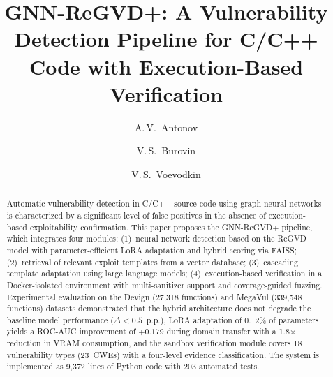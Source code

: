 \documentclass[runningheads]{llncs}
\begin{document}
\title{GNN-ReGVD+: A Vulnerability Detection Pipeline for C/C++ Code with Execution-Based Verification}


\author{A.\,V.~Antonov \and
V.\,S.~Burovin \and
V.\,S.~Voevodkin}



\maketitle

\begin{abstract}
Automatic vulnerability detection in C/C++ source code using graph neural networks is characterized by a significant level of false positives in the absence of execution-based exploitability confirmation. This paper proposes the GNN-ReGVD+ pipeline, which integrates four modules: (1)~neural network detection based on the ReGVD model with parameter-efficient LoRA adaptation and hybrid scoring via FAISS; (2)~retrieval of relevant exploit templates from a vector database; (3)~cascading template adaptation using large language models; (4)~execution-based verification in a Docker-isolated environment with multi-sanitizer support and coverage-guided fuzzing. Experimental evaluation on the Devign (27,318 functions) and MegaVul (339,548 functions) datasets demonstrated that the hybrid architecture does not degrade the baseline model performance ($\Delta < 0.5$~p.p.), LoRA adaptation of 0.12\% of parameters yields a ROC-AUC improvement of $+0.179$ during domain transfer with a 1.8$\times$ reduction in VRAM consumption, and the sandbox verification module covers 18 vulnerability types (23~CWEs) with a four-level evidence classification. The system is implemented as 9,372 lines of Python code with 203 automated tests.

\end{abstract}
\end{document}
